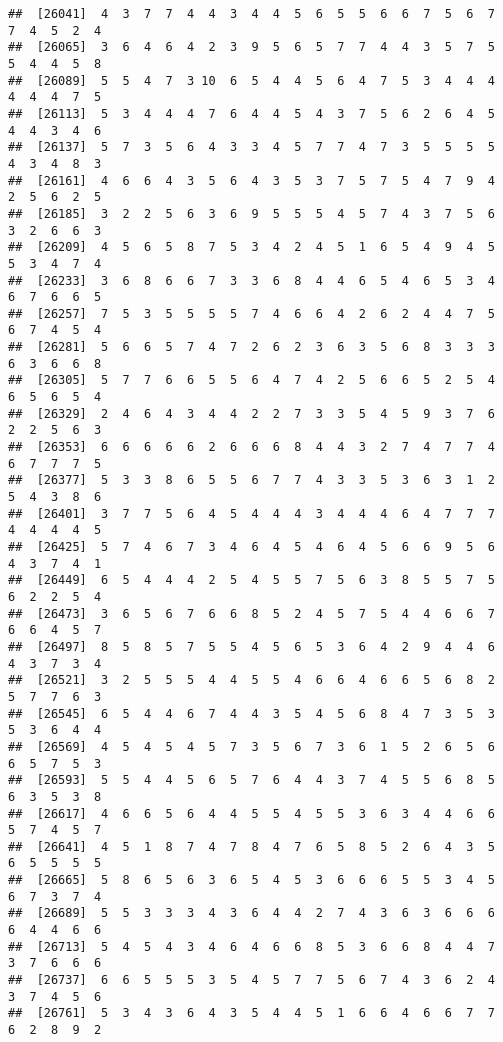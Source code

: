 \documentclass[
]{book}
\begin{document}
\begin{verbatim}
##  [26041]  4  3  7  7  4  4  3  4  4  5  6  5  5  6  6  7  5  6  7  7  4  5  2  4
##  [26065]  3  6  4  6  4  2  3  9  5  6  5  7  7  4  4  3  5  7  5  5  4  4  5  8
##  [26089]  5  5  4  7  3 10  6  5  4  4  5  6  4  7  5  3  4  4  4  4  4  4  7  5
##  [26113]  5  3  4  4  4  7  6  4  4  5  4  3  7  5  6  2  6  4  5  4  4  3  4  6
##  [26137]  5  7  3  5  6  4  3  3  4  5  7  7  4  7  3  5  5  5  5  4  3  4  8  3
##  [26161]  4  6  6  4  3  5  6  4  3  5  3  7  5  7  5  4  7  9  4  2  5  6  2  5
##  [26185]  3  2  2  5  6  3  6  9  5  5  5  4  5  7  4  3  7  5  6  3  2  6  6  3
##  [26209]  4  5  6  5  8  7  5  3  4  2  4  5  1  6  5  4  9  4  5  5  3  4  7  4
##  [26233]  3  6  8  6  6  7  3  3  6  8  4  4  6  5  4  6  5  3  4  6  7  6  6  5
##  [26257]  7  5  3  5  5  5  5  7  4  6  6  4  2  6  2  4  4  7  5  6  7  4  5  4
##  [26281]  5  6  6  5  7  4  7  2  6  2  3  6  3  5  6  8  3  3  3  6  3  6  6  8
##  [26305]  5  7  7  6  6  5  5  6  4  7  4  2  5  6  6  5  2  5  4  6  5  6  5  4
##  [26329]  2  4  6  4  3  4  4  2  2  7  3  3  5  4  5  9  3  7  6  2  2  5  6  3
##  [26353]  6  6  6  6  6  2  6  6  6  8  4  4  3  2  7  4  7  7  4  6  7  7  7  5
##  [26377]  5  3  3  8  6  5  5  6  7  7  4  3  3  5  3  6  3  1  2  5  4  3  8  6
##  [26401]  3  7  7  5  6  4  5  4  4  4  3  4  4  4  6  4  7  7  7  4  4  4  4  5
##  [26425]  5  7  4  6  7  3  4  6  4  5  4  6  4  5  6  6  9  5  6  4  3  7  4  1
##  [26449]  6  5  4  4  4  2  5  4  5  5  7  5  6  3  8  5  5  7  5  6  2  2  5  4
##  [26473]  3  6  5  6  7  6  6  8  5  2  4  5  7  5  4  4  6  6  7  6  6  4  5  7
##  [26497]  8  5  8  5  7  5  5  4  5  6  5  3  6  4  2  9  4  4  6  4  3  7  3  4
##  [26521]  3  2  5  5  5  4  4  5  5  4  6  6  4  6  6  5  6  8  2  5  7  7  6  3
##  [26545]  6  5  4  4  6  7  4  4  3  5  4  5  6  8  4  7  3  5  3  5  3  6  4  4
##  [26569]  4  5  4  5  4  5  7  3  5  6  7  3  6  1  5  2  6  5  6  6  5  7  5  3
##  [26593]  5  5  4  4  5  6  5  7  6  4  4  3  7  4  5  5  6  8  5  6  3  5  3  8
##  [26617]  4  6  6  5  6  4  4  5  5  4  5  5  3  6  3  4  4  6  6  5  7  4  5  7
##  [26641]  4  5  1  8  7  4  7  8  4  7  6  5  8  5  2  6  4  3  5  6  5  5  5  5
##  [26665]  5  8  6  5  6  3  6  5  4  5  3  6  6  6  5  5  3  4  5  6  7  3  7  4
##  [26689]  5  5  3  3  3  4  3  6  4  4  2  7  4  3  6  3  6  6  6  6  4  4  6  6
##  [26713]  5  4  5  4  3  4  6  4  6  6  8  5  3  6  6  8  4  4  7  3  7  6  6  6
##  [26737]  6  6  5  5  5  3  5  4  5  7  7  5  6  7  4  3  6  2  4  3  7  4  5  6
##  [26761]  5  3  4  3  6  4  3  5  4  4  5  1  6  6  4  6  6  7  7  6  2  8  9  2

\end{verbatim}
\end{document}
